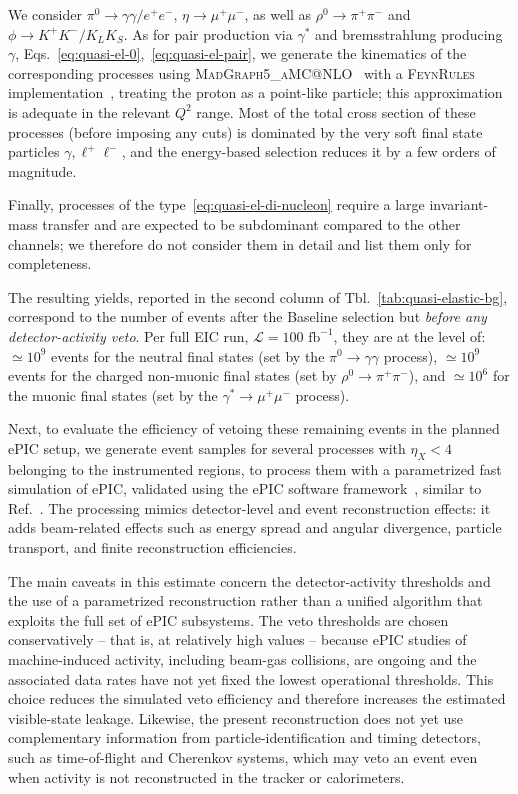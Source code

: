 \documentclass[aps,prd,preprintnumbers,superscriptaddress,nofootinbib,floatfix,twocolumn,notitlepage,reprint]{revtex4-2}
\newcommand{\cL}{\mathcal{L}}
\begin{document}
We consider $\pi^{0}\to \gamma\gamma/e^{+}e^{-}$, $\eta\to \mu^{+}\mu^{-}$, as well as $\rho^{0}\to \pi^{+}\pi^{-}$ and $\phi \to K^{+}K^{-}/K_{L}K_{S}$. 
As for pair production via $\gamma^{*}$ and bremsstrahlung producing $\gamma$, Eqs.~\eqref{eq:quasi-el-0},~\eqref{eq:quasi-el-pair}, we generate the kinematics of the corresponding processes using \textsc{MadGraph5\_aMC@NLO}~\cite{Alwall:2014hca} with a \textsc{FeynRules} implementation~\cite{Alloul:2013bka,Christensen:2008py}, treating the proton as a point-like particle; this approximation is adequate in the relevant $Q^{2}$ range. 
Most of the total cross section of these processes (before imposing any cuts) is dominated by the very soft final state particles $\gamma, \ell^{+}\ell^{-}$, and the energy-based selection reduces it by a few orders of magnitude. 

Finally, processes of the type~\eqref{eq:quasi-el-di-nucleon} require a large invariant-mass transfer and are expected to be subdominant compared to the other channels; we therefore do not consider them in detail and list them only for completeness.

The resulting yields, reported in the second column of Tbl.~\ref{tab:quasi-elastic-bg}, correspond to the number of events after the Baseline selection but \emph{before any detector-activity veto}. Per full EIC run, $\cL = 100\text{ fb}^{-1}$, they are at the level of: $\simeq 10^{9}$ events for the neutral final states (set by the $\pi^{0}\to \gamma\gamma$ process), $\simeq 10^{9}$ events for the charged non-muonic final states (set by $\rho^{0}\to \pi^{+}\pi^{-}$), and $\simeq 10^{6}$ for the muonic final states (set by the $\gamma^{*}\to \mu^{+}\mu^{-}$ process).
 
Next, to evaluate the efficiency of vetoing these remaining events in the planned ePIC setup, we generate event samples for several processes with $\eta_{X}<4$ belonging to the instrumented regions, to process them with a parametrized fast simulation of ePIC, validated using the ePIC software framework~\cite{ref:ePIC_dd4hep}, similar to Ref.~\cite{dvcs2025}. 
The processing mimics detector-level and event reconstruction effects: 
it adds beam-related effects such as energy spread and angular divergence, particle transport, and finite reconstruction efficiencies.

The main caveats in this estimate concern the detector-activity thresholds and the use of a parametrized reconstruction rather than a unified algorithm that exploits the full set of ePIC subsystems.
The veto thresholds are chosen conservatively -- that is, at relatively high values -- because ePIC studies of machine-induced activity, including beam-gas collisions, are ongoing and the associated data rates have not yet fixed the lowest operational thresholds.
This choice reduces the simulated veto efficiency and therefore increases the estimated visible-state leakage.
Likewise, the present reconstruction does not yet use complementary information from particle-identification and timing detectors, such as time-of-flight and Cherenkov systems, which may veto an event even when activity is not reconstructed in the tracker or calorimeters.
\end{document}
